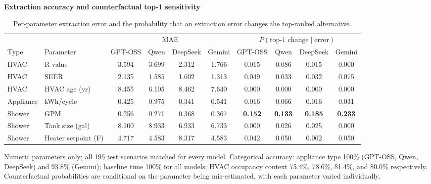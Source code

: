 \documentclass[a4paper,fleqn]{cas-dc}
\begin{document}
\begin{table}[htbp]
\begin{threeparttable}
\footnotesize
\centering
\textbf{Extraction accuracy and counterfactual top-1 sensitivity}
\renewcommand{\arraystretch}{1.15}
\setlength{\tabcolsep}{4pt}
\begin{tabular}{llcccccccc}
\toprule
 & & \multicolumn{4}{c}{MAE} & \multicolumn{4}{c}{$P(\text{top-1 change} \mid \text{error})$} \\
\cmidrule(lr){3-6}\cmidrule(lr){7-10}
Type & Parameter & GPT-OSS & Qwen & DeepSeek & Gemini & GPT-OSS & Qwen & DeepSeek & Gemini \\
\midrule
HVAC & R-value & 3.594 & 3.699 & 2.312 & 1.766 & 0.015 & 0.086 & 0.015 & 0.000 \\
HVAC & SEER & 2.135 & 1.585 & 1.602 & 1.313 & 0.049 & 0.033 & 0.032 & 0.075 \\
HVAC & HVAC age (yr) & 8.455 & 6.105 & 8.462 & 7.640 & 0.000 & 0.000 & 0.000 & 0.000 \\
Appliance & kWh/cycle & 0.425 & 0.975 & 0.341 & 0.541 & 0.016 & 0.066 & 0.016 & 0.031 \\
Shower & GPM & 0.256 & 0.271 & 0.368 & 0.367 & \textbf{0.152} & \textbf{0.133} & \textbf{0.185} & \textbf{0.233} \\
Shower & Tank size (gal) & 8.100 & 8.933 & 6.933 & 6.733 & 0.000 & 0.026 & 0.025 & 0.000 \\
Shower & Heater setpoint (\textdegree{}F) & 4.717 & 4.583 & 8.317 & 4.583 & 0.042 & 0.050 & 0.062 & 0.050 \\
\bottomrule
\end{tabular}
\setlength{\tabcolsep}{6pt}
\renewcommand{\arraystretch}{1.0}
\begin{tablenotes}
\item Numeric parameters only; all 195 test scenarios matched for every model. Categorical accuracy: appliance type 100\% (GPT-OSS, Qwen, DeepSeek) and 93.8\% (Gemini); baseline time 100\% for all models; HVAC occupancy context 75.4\%, 78.6\%, 81.4\%, and 80.0\% respectively. Counterfactual probabilities are conditional on the parameter being mis-estimated, with each parameter varied individually.
\end{tablenotes}
\end{threeparttable}
\caption{Per-parameter extraction error and the probability that an extraction error changes the top-ranked alternative.}
\label{tab:extraction_accuracy}
\end{table}
\end{document}
